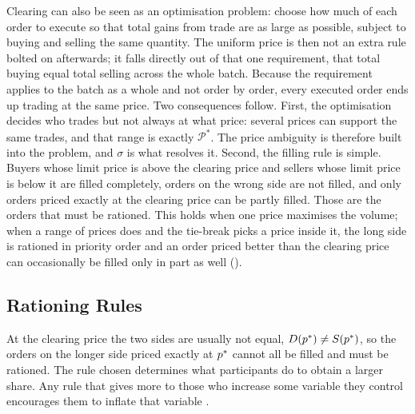 Clearing can also be seen as an optimisation problem: choose how much of each
order to execute so that total gains from trade are as large as possible,
subject to buying and selling the same quantity. The uniform price is then not
an extra rule bolted on afterwards; it falls directly out of that one
requirement, that total buying equal total selling across the whole
batch. Because the requirement applies to the batch as a whole and not
order by order, every executed order ends up trading at the same price.
Two consequences follow. First, the optimisation decides who trades but
not always at what price: several prices can support the same trades, and
that range is exactly $\mathcal{P}^{*}$. The price ambiguity is therefore
built into the problem, and $\sigma$ is what resolves it. Second, the
filling rule is simple. Buyers whose limit price is above the clearing price
and sellers whose limit price is below it are filled completely, orders on the
wrong side are not filled, and only orders priced exactly at the clearing
price can be partly filled. Those are the orders that must be rationed. This
holds when one price maximises the volume; when a range of prices does and the
tie-break picks a price inside it, the long side is rationed in priority order
and an order priced better than the clearing price can occasionally be filled
only in part as well ().

\subsection{Rationing Rules}
\label{sec:rationing}

At the clearing price the two sides are usually not equal, $D(p^{\ast}) \neq
S(p^{\ast})$, so the orders on the longer side priced exactly at $p^{\ast}$ cannot all
be filled and must be rationed. The rule chosen determines what participants
do to obtain a larger share. Any rule that gives more to those who increase some
variable they control encourages them to inflate that variable
\citep{haynes2020precedence}.

